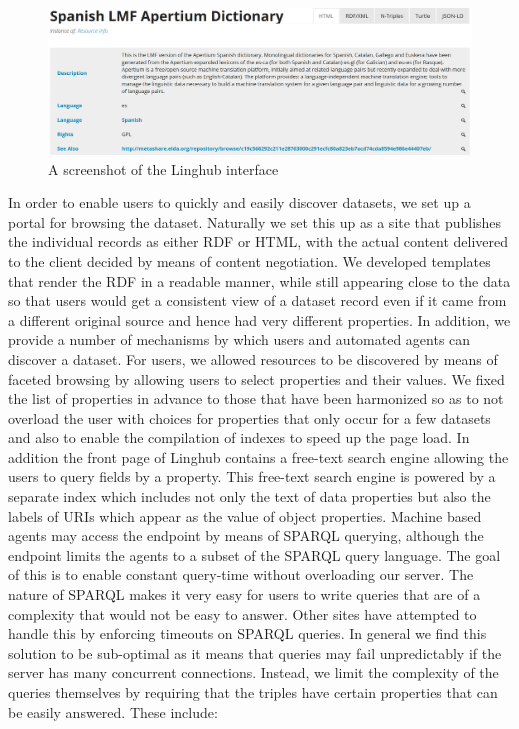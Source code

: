 \documentclass{acm_proc_article-sp}
\begin{document}
\begin{figure}
\includegraphics[width=.9\textwidth]{linghub-screenshot.png}
\caption{A screenshot of the Linghub interface\label{fig:screenshot}}
\end{figure}

In order to enable users to quickly and easily discover datasets, we set up a 
portal for browsing the dataset. Naturally we set this up as a site that publishes
the individual records as either RDF or HTML, with the actual content delivered
to the client decided by means of content negotiation. We developed 
templates that render the RDF in a readable manner, while still appearing close
to the data so that users would get a consistent view of a dataset record even
if it came from a different original source and hence had very different
properties.
In addition, we provide a 
number of mechanisms by which users and automated agents can discover a dataset.
For users, we allowed resources to be discovered by means of faceted browsing by
allowing users to select properties and their values. We fixed the list of
properties in advance to those that have been harmonized so as to not overload
the user with choices for properties that only occur for a few datasets and also
to enable the compilation of indexes to speed up the page load. In addition the
front page of Linghub contains a free-text search engine allowing the users to
query fields by a property. This free-text search engine is powered by a
separate index which includes not only the text of data properties but also the
labels of URIs which appear as the value of object properties. 
Machine based agents may access
the endpoint by means of SPARQL querying, although the endpoint limits the agents
to a subset of the SPARQL query language. The goal of this is to enable constant
query-time without overloading our server. The nature of SPARQL makes it very
easy for users to write queries that are of a complexity that would not be easy
to answer. Other sites have attempted to handle this by enforcing timeouts on
SPARQL queries. In general we find this solution to be sub-optimal as it
means that queries may fail unpredictably if the server has many concurrent
connections. Instead, we limit the complexity of the queries themselves by
requiring that the triples have certain properties that can be easily answered.
These include:
\end{document}
